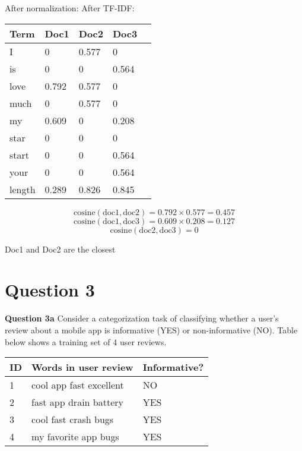 \documentclass[11pt,a4paper]{report}
\begin{document}
\begin{multicols*}{2}
\noindent After normalization:
\noindent After TF-IDF:
\begin{center}
\begin{tabular}{ | l | l l l |l|} 
    \hline
    Term   & Doc1 & Doc2 & Doc3 \\
    \hline
    I      &0     &0.577 &0     \\
    is     &0     &0     &0.564 \\
    love   &0.792 &0.577 &0     \\
    much   &0     &0.577 &0     \\
    my     &0.609 &0     &0.208 \\
    star   &0     &0     &0     \\
    start  &0     &0     &0.564 \\
    your   &0     &0     &0.564 \\
    \hline
    length &0.289 &0.826 &0.845 \\
    \hline
\end{tabular}
\end{center}

$$\text{cosine}(\text{doc1},\text{doc2})=0.792 \times 0.577 = 0.457$$
$$\text{cosine}(\text{doc1},\text{doc3})=0.609 \times 0.208 = 0.127$$
$$\text{cosine}(\text{doc2},\text{doc3})=0$$

\noindent Doc1 and Doc2 are the closest

\section{Question 3}

\noindent \textbf{Question 3a} Consider a categorization task of classifying whether a user's review about a mobile app is informative (YES) or non-informative (NO). Table below shows a training set of 4 user reviews.

\begin{center}
\begin{tabular}{ | l | l |l|} 
    \hline
    ID & Words in user review & Informative? \\
    \hline
    1  & cool app fast excellent & NO \\
    2  & fast app drain battery & YES \\
    3  & cool fast crash bugs & YES \\
    4  & my favorite app bugs & YES \\
    \hline
\end{tabular}
\end{center}


\end{multicols*}
\end{document}
